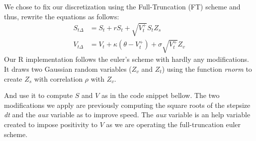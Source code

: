 \documentclass[12pt,oneside]{reedthesis}
\theoremstyle{definition}
\theoremstyle{definition}
\theoremstyle{remark}
\begin{document}
  We chose to fix our discretization using the Full-Truncation (FT) scheme
  and thus, rewrite the equations as follows:
  \begin{align}
  \label{eq:st1}
  S_{t\Delta} &= S_t + rS_t + \sqrt{V_{t}^{+}} S_t Z_s \\
  \label{eq:vt1}
  V_{t\Delta} &= V_t + \kappa (\theta - V_{t}^{+}) + \sigma \sqrt{V_{t}^{+}} Z_v 
  \end{align}
  Our R implementation follows the euler's scheme with hardly any
  modifications. It draws two Gaussian random variables (\(Z_v\) and
  \(Z_t\)) using the function \emph{rnorm} to create \(Z_s\) with
  correlation \(\rho\) with \(Z_v\).
  \begin{Shaded}
  \begin{Highlighting}[]
  \StringTok{ }\OperatorTok{::}
  \StringTok{ }\OperatorTok{::}
  \StringTok{ }\OperatorTok{*}\StringTok{ }\OperatorTok{+}\StringTok{ }\NormalTok{(}\NormalTok{(} \OperatorTok{-}\StringTok{ }\OperatorTok{^}\NormalTok{)) }\OperatorTok{*}\StringTok{ }
  \end{Highlighting}
  \end{Shaded}
  And use it to compute \(S\) and \(V\) as in the code snippet bellow. The
  two modifications we apply are previously computing the square roots of
  the stepsize \emph{dt} and the \emph{aux} variable as to improve speed.
  The \emph{aux} variable is an help variable created to impose positivity
  to \(V\) as we are operating the full-truncation euler scheme.
  \begin{Shaded}
  \begin{Highlighting}[]
  \StringTok{ }\OperatorTok{*}\StringTok{ }\NormalTok{(} \OperatorTok{+}\StringTok{ }\OperatorTok{*}\StringTok{ }\OperatorTok{+}\StringTok{ }\OperatorTok{*}\StringTok{ }\OperatorTok{*}\StringTok{ }
  \StringTok{ }\OperatorTok{+}\StringTok{ }\OperatorTok{*}\StringTok{ }\OperatorTok{*}\StringTok{ }\OperatorTok{-}\StringTok{ }\OperatorTok{+}\StringTok{ }
  \StringTok{                     }\OperatorTok{*}\StringTok{ }\OperatorTok{*}\StringTok{ }\OperatorTok{*}\StringTok{ }
  \end{Highlighting}
  \end{Shaded}
\end{document}
